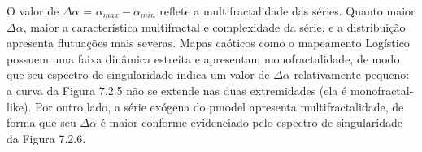 O valor de $\Delta \alpha$ = $\alpha_{max} - \alpha_{min}$ reflete a multifractalidade das séries. Quanto maior $\Delta \alpha$, maior a característica multifractal e complexidade da série, e a distribuição apresenta flutuações mais severas. Mapas caóticos como o mapeamento Logístico possuem uma faixa dinâmica estreita e apresentam monofractalidade, de modo que seu espectro de singularidade indica um valor de $\Delta \alpha$ relativamente pequeno: a curva da Figura 7.2.5 não se extende nas duas extremidades (ela é monofractal-like). Por outro lado, a série exógena do pmodel apresenta multifractalidade, de forma que seu $\Delta \alpha$ é maior conforme evidenciado pelo espectro de singularidade da Figura 7.2.6.

\begin{figure}[ht!]
	\vspace{-3mm}	%
	\begin{center}
	\end{center}
	\vspace{-3mm}	%
	\label{ex6_fig1}
\end{figure}

